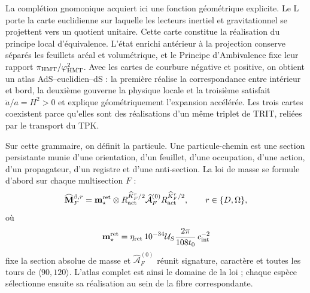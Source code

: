 La complétion gnomonique acquiert ici une fonction géométrique explicite. Le
L porte la carte euclidienne sur laquelle les lecteurs inertiel et gravitationnel
se projettent vers un quotient unitaire. Cette carte constitue la réalisation du
principe local d'équivalence. L'état enrichi antérieur à la
projection conserve séparés les feuillets aréal et volumétrique, et le Principe
d'Ambivalence fixe leur rapport
\(\pi_{\rm HMT}/\varphi_{\rm HMT}^{2}\). Avec les cartes de courbure
négative et positive, on obtient un atlas AdS--euclidien--dS : la première
réalise la correspondance entre intérieur et bord, la deuxième gouverne la
physique locale et la troisième satisfait \(\ddot a/a=H^2>0\) et explique
géométriquement l'expansion accélérée. Les trois cartes coexistent parce qu'elles sont des
réalisations d'un même triplet de TRIT, reliées par le transport du
TPK.

Sur cette grammaire, on définit la particule. Une particule-chemin est une section
persistante munie d'une orientation, d'un feuillet, d'une occupation, d'une action, d'un propagateur,
d'un registre et d'une anti-section. La loi de masse se formule d'abord sur chaque
multisection \(F\) :
\[
 \widehat{\mathbf M}^{\beta,r}_F
 =\mathbf m_\star^{\rm ret}\otimes
  R_{\rm act}^{\widehat K_F^r/2}
  \widehat{\mathcal A}^{(0)}_F
  R_{\rm act}^{\widehat K_F^r/2},
 \qquad r\in\{D,\Omega\},
\]
où
\[
 \mathbf m_\star^{\rm ret}
 =\eta_{\rm ret}\,10^{-34}\mathcal U_S
   \frac{2\pi}{108t_0}\,c_{\rm int}^{-2}
\]
fixe la section absolue de masse et
\(\widehat{\mathcal A}^{(0)}_F\) réunit signature, caractère et toutes les tours de
\(\langle90,120\rangle\). L'atlas complet est ainsi le domaine de la loi ; chaque
espèce sélectionne ensuite sa réalisation au sein de la fibre correspondante.

